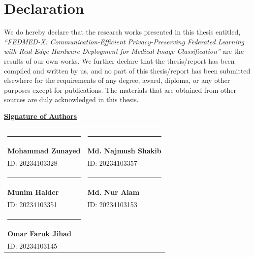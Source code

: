 \chapter*{Declaration}

We do hereby declare that the research works presented in this thesis entitled,
\textit{``FEDMED-X: Communication-Efficient Privacy-Preserving Federated
Learning with Real Edge Hardware Deployment for Medical Image
Classification''} are the results of our own works. We further declare that the
thesis/report has been compiled and written by us, and no part of this
thesis/report has been submitted elsewhere for the requirements of any degree,
award, diploma, or any other purposes except for publications. The materials
that are obtained from other sources are duly acknowledged in this thesis.

\vspace{25pt}
\noindent\underline{\textbf{Signature of Authors}}

\vspace{20pt}
\noindent
\begin{tabularx}{\textwidth}{@{}XX@{}}
\rule{5cm}{0.4pt} & \rule{5cm}{0.4pt} \\
\textbf{Mohammad Zunayed}       & \textbf{Md. Najmush Shakib} \\
ID: 20234103328                 & ID: 20234103357             \\[24pt]
\rule{5cm}{0.4pt} & \rule{5cm}{0.4pt} \\
\textbf{Munim Halder}           & \textbf{Md. Nur Alam}        \\
ID: 20234103351                 & ID: 20234103153              \\[24pt]
\rule{5cm}{0.4pt} &                                            \\
\textbf{Omar Faruk Jihad}       &                              \\
ID: 20234103145                 &                              \\
\end{tabularx}